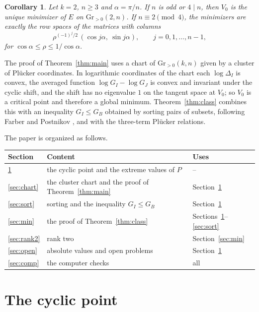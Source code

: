 \documentclass[11pt]{article}
\newtheorem{corollary}[theorem]{Corollary}
\theoremstyle{remark}
\newcommand{\Gr}{\mathrm{Gr}}
\begin{document}
\begin{corollary}\label{cor:rank2}
Let $k=2$, $n\ge3$ and $\alpha=\pi/n$. If $n$ is odd or $4\mid n$, then $V_0$ is the unique minimizer of $E$ on $\Gr_{>0}(2,n)$. If $n\equiv2\pmod4$, the minimizers are exactly the row spaces of the matrices with columns
\[
\rho^{(-1)^j/2}\,(\cos j\alpha,\ \sin j\alpha),\qquad j=0,1,\dots,n-1,
\]
for $\cos\alpha\le\rho\le1/\cos\alpha$.
\end{corollary}

The proof of Theorem~\ref{thm:main} uses a chart of $\Gr_{>0}(k,n)$ given by a cluster of Pl\"ucker coordinates. In logarithmic coordinates of the chart each $\log\Delta_I$ is convex, the averaged function $\log G_I-\log G_J$ is convex and invariant under the cyclic shift, and the shift has no eigenvalue $1$ on the tangent space at $V_0$; so $V_0$ is a critical point and therefore a global minimum. Theorem~\ref{thm:class} combines this with an inequality $G_I\le G_B$ obtained by sorting pairs of subsets, following Farber and Postnikov \cite{FP}, and with the three-term Pl\"ucker relations.

The paper is organized as follows.
\begin{center}
\begin{tabular}{lp{9.4cm}l}
\toprule
Section & Content & Uses\\
\midrule
\ref{sec:cyclic} & the cyclic point and the extreme values of $P$ & --\\
\ref{sec:chart} & the cluster chart and the proof of Theorem~\ref{thm:main} & Section~\ref{sec:cyclic}\\
\ref{sec:sort} & sorting and the inequality $G_I\le G_B$ & Section~\ref{sec:cyclic}\\
\ref{sec:min} & the proof of Theorem~\ref{thm:class} & Sections~\ref{sec:cyclic}--\ref{sec:sort}\\
\ref{sec:rank2} & rank two & Section~\ref{sec:min}\\
\ref{sec:open} & absolute values and open problems & Section~\ref{sec:cyclic}\\
\ref{sec:comp} & the computer checks & all\\
\bottomrule
\end{tabular}
\end{center}

\section{The cyclic point}\label{sec:cyclic}
\end{document}
